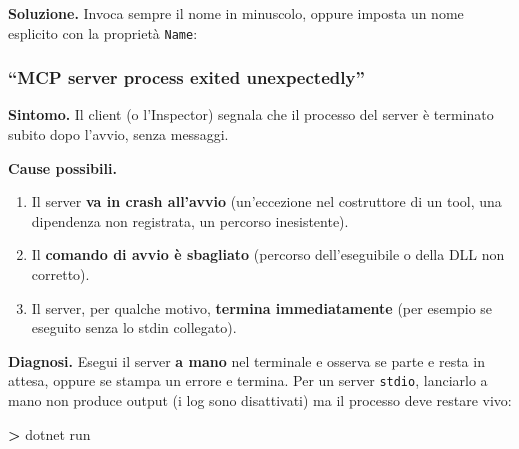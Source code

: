 \documentclass[
  italian,
  10pt,
]{book}
\newenvironment{Shaded}{\begin{snugshade}}{\end{snugshade}}
\newcommand{\DataTypeTok}[1]{\textcolor[rgb]{0.13,0.29,0.53}{#1}}
\newcommand{\ExtensionTok}[1]{#1}
\newcommand{\FunctionTok}[1]{\textcolor[rgb]{0.13,0.29,0.53}{\textbf{#1}}}
\newcommand{\KeywordTok}[1]{\textcolor[rgb]{0.13,0.29,0.53}{\textbf{#1}}}
\newcommand{\NormalTok}[1]{#1}
\newcommand{\OperatorTok}[1]{\textcolor[rgb]{0.81,0.36,0.00}{\textbf{#1}}}
\newcommand{\StringTok}[1]{\textcolor[rgb]{0.31,0.60,0.02}{#1}}
\providecommand{\tightlist}{%
  \setlength{\itemsep}{0pt}\setlength{\parskip}{0pt}}
\begin{document}
\textbf{Soluzione.} Invoca sempre il nome in minuscolo, oppure imposta
un nome esplicito con la proprietà \texttt{Name}:

\begin{Shaded}
\end{Shaded}

\subsubsection{``MCP server process exited
unexpectedly''}\label{mcp-server-process-exited-unexpectedly}

\textbf{Sintomo.} Il client (o l'Inspector) segnala che il processo del
server è terminato subito dopo l'avvio, senza messaggi.

\textbf{Cause possibili.}

\begin{enumerate}
\def\labelenumi{\arabic{enumi}.}
\tightlist
\item
  Il server \textbf{va in crash all'avvio} (un'eccezione nel costruttore
  di un tool, una dipendenza non registrata, un percorso inesistente).
\item
  Il \textbf{comando di avvio è sbagliato} (percorso dell'eseguibile o
  della DLL non corretto).
\item
  Il server, per qualche motivo, \textbf{termina immediatamente} (per
  esempio se eseguito senza lo stdin collegato).
\end{enumerate}

\textbf{Diagnosi.} Esegui il server \textbf{a mano} nel terminale e
osserva se parte e resta in attesa, oppure se stampa un errore e
termina. Per un server \texttt{stdio}, lanciarlo a mano non produce
output (i log sono disattivati) ma il processo deve restare vivo:

\begin{Shaded}
\begin{Highlighting}[]
\OperatorTok{\textgreater{}}\NormalTok{ dotnet }\ExtensionTok{run}
\end{Highlighting}
\end{Shaded}
\end{document}
